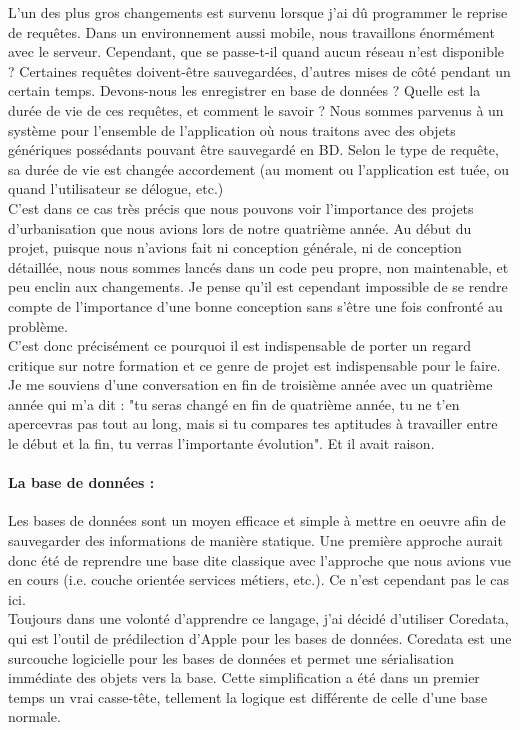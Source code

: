 \documentclass{article}
\begin{document}
		L'un des plus gros changements est survenu lorsque j'ai dû programmer le reprise de requêtes. Dans un environnement aussi mobile, nous travaillons énormément avec le serveur. Cependant, que se passe-t-il quand aucun réseau n'est disponible ? Certaines requêtes doivent-être sauvegardées, d'autres mises de côté pendant un certain temps. Devons-nous les enregistrer en base de données ? Quelle est la durée de vie de ces requêtes, et comment le savoir ? Nous sommes parvenus à un système pour l'ensemble de l'application où nous traitons avec des objets génériques possédants pouvant être sauvegardé en BD. Selon le type de requête, sa durée de vie est changée accordement (au moment ou l'application est tuée, ou quand l'utilisateur se délogue, etc.)  	\\
		
		C'est dans ce cas très précis que nous pouvons voir l'importance des projets d'urbanisation que nous avions lors de notre quatrième année. Au début du projet, puisque nous n'avions fait ni conception générale, ni de conception détaillée, nous nous sommes lancés dans un code peu propre, non maintenable, et peu enclin aux changements. Je pense qu'il est cependant impossible de se rendre compte de l'importance d'une bonne conception sans s'être une fois confronté au problème. \\
		
		C'est donc précisément ce pourquoi il est indispensable de porter un regard critique sur notre formation et ce genre de projet est indispensable pour le faire. Je me souviens d'une conversation en fin de troisième année avec un quatrième année qui m'a dit : "tu seras changé en fin de quatrième année, tu ne t'en apercevras pas tout au long, mais si tu compares tes aptitudes à travailler entre le début et la fin, tu verras l'importante évolution". Et il avait raison.\\
				
		\paragraph{La base de données :}
		Les bases de données sont un moyen efficace et simple à mettre en oeuvre afin de sauvegarder des informations de manière statique. Une première approche aurait donc été de reprendre une base dite classique avec l'approche que nous avions vue en cours (i.e. couche orientée services métiers, etc.). Ce n'est cependant pas le cas ici.\\
			
		Toujours dans une volonté d'apprendre ce langage, j'ai décidé d'utiliser Coredata, qui est l'outil de prédilection d'Apple pour les bases de données. Coredata est une surcouche logicielle pour les bases de données et permet une sérialisation immédiate des objets vers la base. Cette simplification a été dans un premier temps un vrai casse-tête, tellement la logique est différente de celle d'une base normale. \\
		
\end{document}
